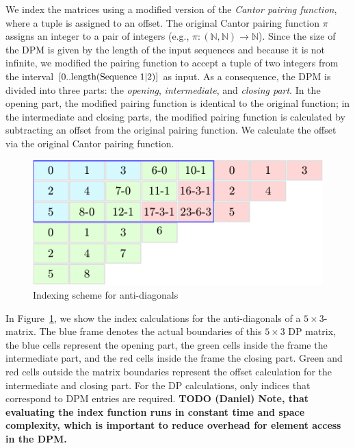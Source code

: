 \documentclass[runningheads,a4paper]{llncs}
\begin{document}
We index the matrices using a modified version of the \textit{Cantor pairing function}, where a tuple is assigned to an offset.
The original Cantor pairing function $\pi$ assigns an integer to a pair of integers (e.g., $\pi: (\mathbb{N}, \mathbb{N}) \rightarrow \mathbb{N}$).
Since the size of the DPM is given by the length of the input sequences and because it is not infinite,
we modified the pairing function to accept a tuple of two integers from the interval $[0..\textrm{length}(\textrm{Sequence 1\textbar2})]$ as input.
As a consequence, the DPM is divided into three parts: the \emph{opening}, \emph{intermediate}, and \emph{closing part}.
In the opening part, the modified pairing function is identical to the original function; in the intermediate and closing parts,
the modified pairing function is calculated by subtracting an offset from the original pairing function.
We calculate the offset via the original Cantor pairing function.

\begin{figure}[ht!]
  \centering
  \includegraphics[scale=0.9]{figures/pairingfunc.pdf}
  \caption{Indexing scheme for anti-diagonals}
  \label{fig:pairingfunc}
\end{figure}

In Figure~\ref{fig:pairingfunc}, we show the index calculations for the anti-diagonals of a $5\times3$-matrix.
The blue frame denotes the actual boundaries of this $5\times3$ DP matrix, the blue cells represent the opening part,
the green cells inside the frame the intermediate part, and the red cells inside the frame the closing part.
Green and red cells outside the matrix boundaries represent the offset calculation for the intermediate and closing part.
For the DP calculations, only indices that correspond to DPM entries are required.
{\bf TODO (Daniel) Note, that evaluating the index function runs in constant time and space complexity, which is important to reduce overhead for element access in the DPM.}
\end{document}
